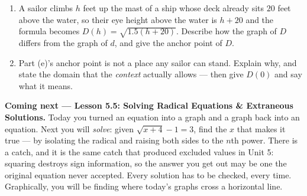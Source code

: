 \documentclass[10pt]{article}
\begin{document}
\begin{extensionbox}
\begin{enumerate}[label=(\alph*), leftmargin=1.8em, itemsep=5pt]
{        $y=\sqrt{h}$ with a single \underline{\hspace{2.4cm}} applied to it.}
  \item A sailor climbs $h$ feet up the mast of a ship whose deck already sits $20$ feet above the
        water, so their eye height above the water is $h+20$ and the formula becomes
        $D(h)=\sqrt{1.5(h+20)}$. Describe how the graph of $D$ differs from the graph of $d$, and
        give the anchor point of $D$. 
  \item Part (e)'s anchor point is not a place any sailor can stand. Explain why, and state the
        domain that the \emph{context} actually allows --- then give $D(0)$ and say what it means.
\end{enumerate}
\end{extensionbox}

\begin{spiralbox}
\textbf{Coming next --- Lesson 5.5: Solving Radical Equations \& Extraneous Solutions.} Today you
turned an equation into a graph and a graph back into an equation. Next you will \emph{solve}: given
$\sqrt{x+4}-1=3$, find the $x$ that makes it true --- by isolating the radical and raising both sides
to the $n$th power. There is a catch, and it is the same catch that produced excluded values in Unit
5: squaring destroys sign information, so the answer you get out may be one the original equation
never accepted. Every solution has to be checked, every time. Graphically, you will be finding where
today's graphs cross a horizontal line.
\end{spiralbox}
\end{document}
